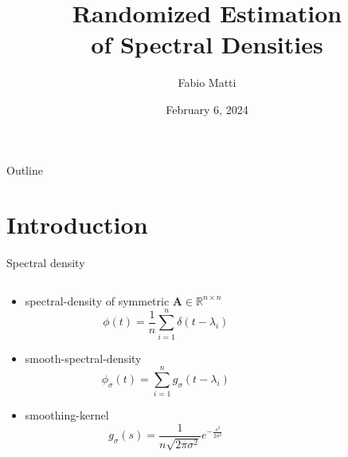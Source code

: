 \documentclass[aspectratio=169, leqno, 12pt]{beamer}
\title{Randomized Estimation \\ of Spectral Densities}
\date{February 6, 2024}
\author{Fabio Matti}
\newcommand{\mtx}[1]{\boldsymbol{#1}}
\begin{document}
\begin{frame}[noframenumbering]

    \titlepage

\end{frame}

\begin{frame}{Outline}

    \tableofcontents

    \begin{centering}
        
    \end{centering}
\end{frame}


\section{Introduction}

\begin{frame}{Spectral density}
    \begin{columns}
        \begin{column}{0.7\textwidth}
            \begin{itemize}
                \item \Gls{spectral-density} of symmetric $\mtx{A} \in \mathbb{R}^{n \times n}$
                \begin{equation}
                    \phi(t) = \frac{1}{n} \sum_{i=1}^n \delta(t - \lambda_i)
                \end{equation}
                \item \Gls{smooth-spectral-density}
                \begin{equation}
                    \phi_{\sigma}(t) = \sum_{i=1}^n g_{\sigma}(t - \lambda_i)
                \end{equation}
                \item \Gls{smoothing-kernel}
                \begin{equation}
                    g_{\sigma}(s) = \frac{1}{n \sqrt{2 \pi \sigma^2}} e^{-\frac{s^2}{2\sigma^2}}
                \end{equation}
            \end{itemize}
        \end{column}
        \begin{column}{0.3\textwidth}
            \centering
        \end{column}
    \end{columns}
\end{frame}
\end{document}
